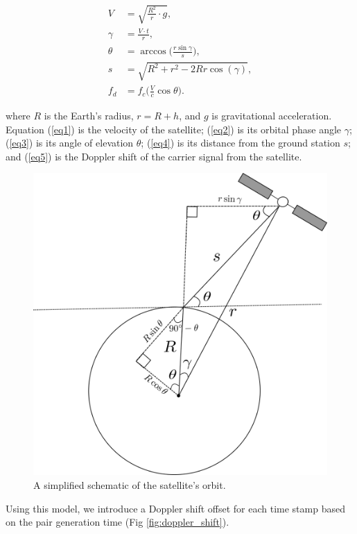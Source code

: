 \begin{align}
V &= \sqrt{\frac{R^2}{r} \cdot g}, \label{eq1} \\
\gamma &= \frac{V \cdot t}{r}, \label{eq2} \\
\theta &= \arccos\Big(\frac{r\sin\gamma}{s}\Big), \label{eq3} \\
s &= \sqrt{R^2 + r^2 - 2Rr\cos(\gamma)}, \label{eq4}\\
f_d &= f_c \Big(\frac{V}{c} \cos\theta\Big). \label{eq5}
\end{align}

\noindent where $R$ is the Earth's radius, $r = R + h$, and $g$ is gravitational acceleration. Equation (\ref{eq1}) is the velocity of the satellite; (\ref{eq2}) is its orbital phase angle $\gamma$; (\ref{eq3}) is its angle of elevation $\theta$; (\ref{eq4}) is its distance from the ground station $s$; and (\ref{eq5}) is the Doppler shift of the carrier signal from the satellite.\\

\begin{figure}[ht!]
	\centering
	\includegraphics[width=0.5\linewidth]{assets/orbit.png}
	\caption{A simplified schematic of the satellite's orbit.}
	\label{fig:orbit}
\end{figure}

Using this model, we introduce a Doppler shift offset for each time stamp based on the pair generation time (Fig \ref{fig:doppler_shift}). 

